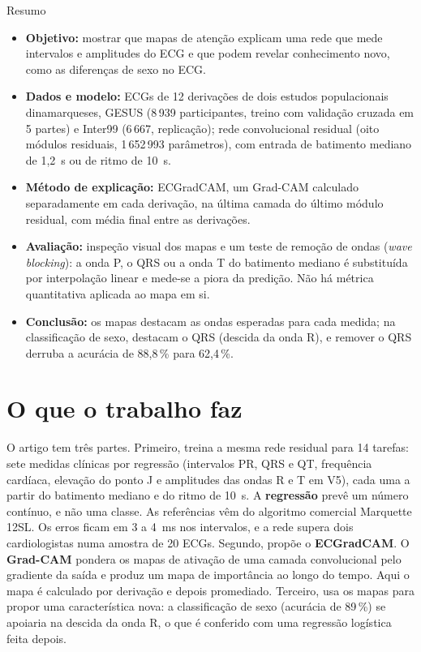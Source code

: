 \documentclass[11pt,a4paper]{article}
\begin{document}
\begin{infobox}[note]{Resumo}
\begin{itemize}
\item \textbf{Objetivo:} mostrar que mapas de atenção explicam uma rede que mede intervalos e amplitudes do ECG e que podem revelar conhecimento novo, como as diferenças de sexo no ECG.
\item \textbf{Dados e modelo:} ECGs de 12 derivações de dois estudos populacionais dinamarqueses, GESUS (8\,939 participantes, treino com validação cruzada em 5 partes) e Inter99 (6\,667, replicação); rede convolucional residual (oito módulos residuais, 1\,652\,993 parâmetros), com entrada de batimento mediano de 1,2~s ou de ritmo de 10~s.
\item \textbf{Método de explicação:} ECGradCAM, um Grad-CAM calculado separadamente em cada derivação, na última camada do último módulo residual, com média final entre as derivações.
\item \textbf{Avaliação:} inspeção visual dos mapas e um teste de remoção de ondas (\textit{wave blocking}): a onda P, o QRS ou a onda T do batimento mediano é substituída por interpolação linear e mede-se a piora da predição. Não há métrica quantitativa aplicada ao mapa em si.
\item \textbf{Conclusão:} os mapas destacam as ondas esperadas para cada medida; na classificação de sexo, destacam o QRS (descida da onda R), e remover o QRS derruba a acurácia de 88,8\,\% para 62,4\,\%.
\end{itemize}
\end{infobox}

\section{O que o trabalho faz}
O artigo tem três partes. Primeiro, treina a mesma rede residual para 14 tarefas: sete medidas clínicas por regressão (intervalos PR, QRS e QT, frequência cardíaca, elevação do ponto J e amplitudes das ondas R e T em V5), cada uma a partir do batimento mediano e do ritmo de 10~s. A \textbf{regressão} prevê um número contínuo, e não uma classe. As referências vêm do algoritmo comercial Marquette 12SL. Os erros ficam em 3 a 4~ms nos intervalos, e a rede supera dois cardiologistas numa amostra de 20 ECGs. Segundo, propõe o \textbf{ECGradCAM}. O \textbf{Grad-CAM} pondera os mapas de ativação de uma camada convolucional pelo gradiente da saída e produz um mapa de importância ao longo do tempo. Aqui o mapa é calculado por derivação e depois promediado. Terceiro, usa os mapas para propor uma característica nova: a classificação de sexo (acurácia de 89\,\%) se apoiaria na descida da onda R, o que é conferido com uma regressão logística feita depois.
\end{document}
